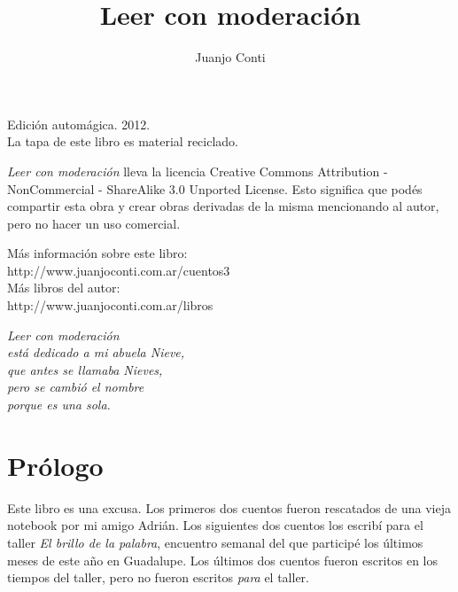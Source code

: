 \documentclass[11pt,twoside,openright,a6paper]{book}
\title{Leer con moderación}
\author{Juanjo Conti}
\date{}
\begin{document}
\pagestyle{plain}

\maketitle

\cleardoublepage

\thispagestyle{empty}
\noindent
Edición automágica. 2012.\\
La tapa de este libro es material reciclado.

\vspace{0.5cm}

\noindent
\emph{Leer con moderación} lleva la licencia 
Creative Commons Attribution - NonCommercial - ShareAlike 3.0 Unported License.
Esto significa que podés compartir esta obra y crear obras derivadas de la misma
mencionando al autor, pero no ha\-cer un uso comercial.

\vfill

\noindent
Más información sobre este libro:\\
http://www.juanjoconti.com.ar/cuentos3\\

\noindent
Más libros del autor:\\
http://www.juanjoconti.com.ar/libros

\cleardoublepage

\noindent
\begin{flushright}
\emph{
\emph{Leer con moderación}\\
está dedicado a mi abuela Nieve,\\
que antes se llamaba Nieves,\\
pero se cambió el nombre\\
porque es una sola.}
\end{flushright}

\cleardoublepage

\renewcommand*\contentsname{Índice}

\tableofcontents

\chapter*{Prólogo}

Este libro es una excusa. Los primeros dos cuentos fueron rescatados de una vieja notebook por mi amigo Adrián.
Los siguientes dos cuentos los escribí para el taller \emph{El brillo de la pala\-bra}, encuentro semanal del que participé los últimos
meses de este año en Guadalupe. Los últimos dos cuentos fueron escritos en los tiempos del taller, pero no fueron escritos \emph{para} el taller.
\end{document}
